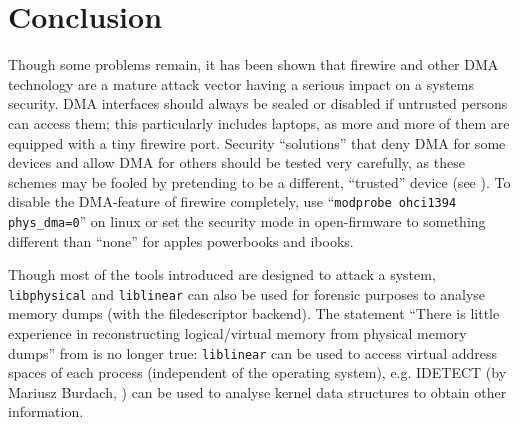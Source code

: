 %
%

\section{Conclusion}

Though some problems remain, it has been shown that firewire and other DMA
technology are a mature attack vector having a serious impact on a systems
security. DMA interfaces should always be sealed or disabled if untrusted
persons can access them; this particularly includes laptops, as more and more of
them are equipped with a tiny firewire port.  Security ``solutions'' that deny
DMA for some devices and allow DMA for others should be tested very carefully,
as these schemes may be fooled by pretending to be a different, ``trusted''
device (see \cite{rux2k6firewire:2006}). To disable the DMA-feature of firewire
completely, use ``\texttt{modprobe ohci1394 phys\_dma=0}'' on linux or set the
security mode in open-firmware to something different than ``none'' for apples
powerbooks and ibooks. 


Though most of the tools introduced are designed to attack a system,
\texttt{libphysical} and \texttt{liblinear} can also be used for forensic
purposes to analyse memory dumps (with the filedescriptor backend). The
statement ``There is little experience in reconstructing logical/virtual memory
from physical memory dumps'' from \cite{cansecwest_firewire:2005} is no longer
true: \texttt{liblinear} can be used to access virtual address spaces of each
process (independent of the operating system), e.g. IDETECT (by Mariusz Burdach,
\cite{finding_digital_evidence_in_physical_memory:2006}) can be used to analyse
kernel data structures to obtain other information.

